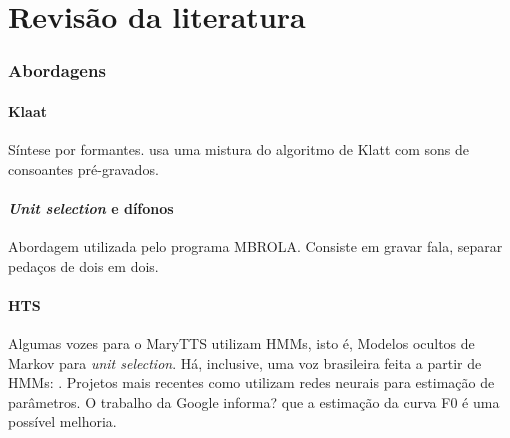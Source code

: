 

\chapter{Revisão da literatura}



\subsection{Abordagens}
\subsubsection{Klaat}
Síntese por formantes. \cite{espeakng} usa uma mistura do algoritmo de Klatt com
sons de consoantes pré-gravados.
\subsubsection{\emph{Unit selection} e dífonos}
Abordagem utilizada pelo programa MBROLA. Consiste em gravar fala, separar
pedaços de dois em dois.

\subsubsection{HTS}
Algumas vozes para o MaryTTS \cite{marytts} utilizam HMMs, isto é, Modelos
ocultos de Markov para \emph{unit selection}. Há, inclusive, uma voz brasileira
feita a partir de HMMs: \cite{couto}.
Projetos mais recentes como \cite{merlin,dnngoogle} utilizam redes neurais para
estimação de parâmetros. O trabalho da Google informa? que a estimação da curva
F0 é uma possível melhoria.

